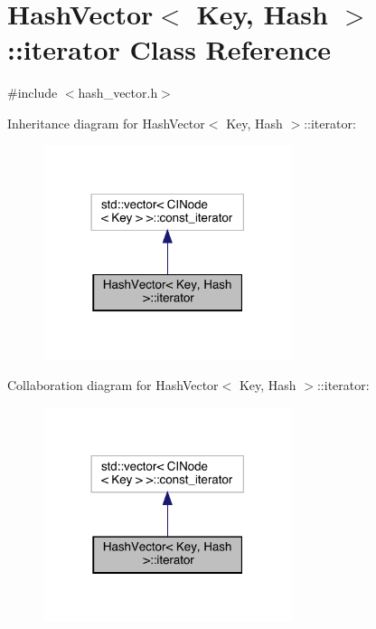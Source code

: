 \hypertarget{class_hash_vector_1_1iterator}{}\section{Hash\+Vector$<$ Key, Hash $>$\+:\+:iterator Class Reference}
\label{class_hash_vector_1_1iterator}


{\ttfamily \#include $<$hash\+\_\+vector.\+h$>$}



Inheritance diagram for Hash\+Vector$<$ Key, Hash $>$\+:\+:iterator\+:
\nopagebreak
\begin{figure}[H]
\begin{center}
\leavevmode
\includegraphics[width=206pt]{class_hash_vector_1_1iterator__inherit__graph}
\end{center}
\end{figure}


Collaboration diagram for Hash\+Vector$<$ Key, Hash $>$\+:\+:iterator\+:
\nopagebreak
\begin{figure}[H]
\begin{center}
\leavevmode
\includegraphics[width=206pt]{class_hash_vector_1_1iterator__coll__graph}
\end{center}
\end{figure}
